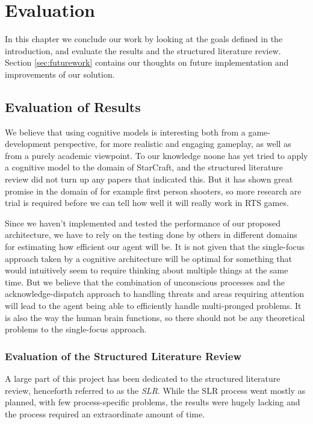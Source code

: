 
\chapter{Evaluation}
In this chapter we conclude our work by looking at the goals defined in the
introduction, and evaluate the results and the structured literature
review. Section \ref{sec:futurework} contains our thoughts on future
implementation and improvements of our solution.


\section{Evaluation of Results}
We believe that using cognitive models is interesting both from a
game-development perspective, for more realistic and engaging gameplay, as well
as from a purely academic viewpoint. To our knowledge noone has yet tried
to apply a cognitive model to the domain of StarCraft, and the structured
literature review did not turn up any papers that indicated this. But it has
shown great promise in the domain of for example first person shooters, so more
research are trial is required before we can tell how well it will really work
in RTS games.

Since we haven't implemented and tested the performance of our proposed
architecture, we have to rely on the testing done by others in different domains
for estimating how efficient our agent will be. It is not given that the
single-focus approach taken by a cognitive architecture will be optimal for
something that would intuitively seem to require thinking about multiple things
at the same time. But we believe that the combination of unconscious processes
and the acknowledge-dispatch approach to handling threats and areas requiring
attention will lead to the agent being able to efficiently handle multi-pronged
problems. It is also the way the human brain functions, so there should not be
any theoretical problems to the single-focus approach.

\subsection{Evaluation of the Structured Literature Review}
A large part of this project has been dedicated to the structured literature
review, henceforth referred to as the \textit{SLR}. While the SLR process went
mostly as planned, with few process-specific problems, the results were hugely
lacking and the process required an extraordinate amount of time.


